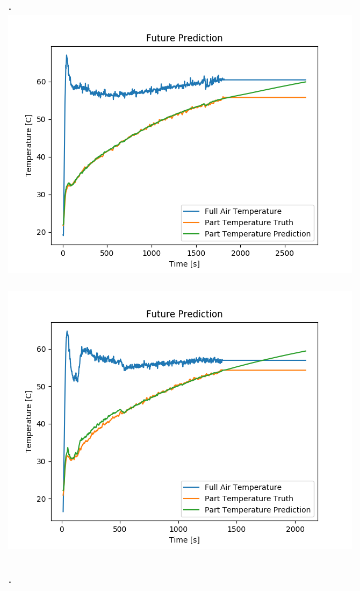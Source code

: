 \begin{figure}[htb]
    \begin{subfigure}{.33\linewidth}.
        \centering
    	\includegraphics[width=\linewidth]{lstm/lstm_w_future1.png}
    \end{subfigure}
    \begin{subfigure}{.33\linewidth}
    	\centering
    	\includegraphics[width=\linewidth]{lstm/lstm_w_future2.png}
    \end{subfigure}
    \begin{subfigure}{.33\linewidth}.
        \centering

\end{subfigure}
\end{figure}

